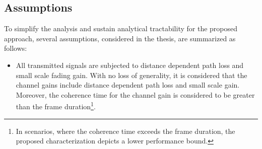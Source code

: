 \subsection{Assumptions}
To simplify the analysis and sustain analytical tractability for the proposed approach, several assumptions, considered in the thesis, are summarized as follows:
\begin{itemize}
\item All transmitted signals are subjected to distance dependent path loss and small scale fading gain. %
With no loss of generality, it is considered that the channel gains include distance dependent path loss and small scale gain. Moreover, the coherence time for the channel gain is considered to be greater than the frame duration\footnote{In scenarios, where the coherence time exceeds the frame duration, the proposed characterization depicts a lower performance bound.}. 

\end{itemize}
